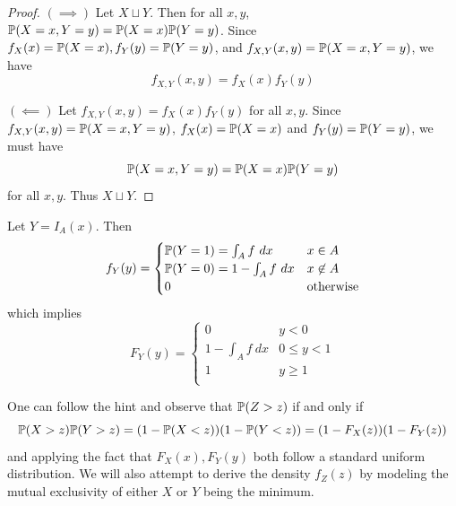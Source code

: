 \documentclass[a4paper]{article}
\begin{document}
\begin{proof}[Proof] 
\((\implies)\) Let \(X \sqcup Y\). Then for all \(x, y\), \(\mathbb{P}(X = x, Y=y) = \mathbb{P}(X = x)\mathbb{P}(Y = y)\). Since \(f_X(x) = \mathbb{P}(X = x), f_Y(y) = \mathbb{P}(Y = y)\), and \(f_{X,Y}(x,y) = \mathbb{P}(X = x, Y = y)\), we have
\[
	f_{X,Y}(x,y) = f_{X}(x)f_{Y}(y)
\]
\par \( (\impliedby) \) Let \(f_{X,Y}(x,y) = f_{X}(x)f_{Y}(y)\) for all \(x, y\). Since \(f_{X,Y}(x,y) = \mathbb{P}(X=x, Y=y)\), \(f_{X}(x) = \mathbb{P}(X=x)\) and \(f_{Y}(y) = \mathbb{P}(Y=y)\), we must have
\[
	\mathbb{P}(X=x, Y=y) = \mathbb{P}(X=x)\mathbb{P}(Y=y)
\]
for all \(x,y\). Thus \(X \sqcup Y\).
\end{proof}

Let \(Y = I_{A}(x)\). Then
\[
	f_{Y}(y) = \begin{cases}
		\mathbb{P}(Y = 1) = \int_{A} f \ dx & x \in A \\
		\mathbb{P}(Y = 0) = 1 - \int_{A} f \ dx & x \not\in A \\
		0 & \text{otherwise}
	\end{cases}
\]
which implies
\[
	F_{Y}(y) = \begin{cases}
		0 & y < 0 \\
		1 - \int_{A} f \ dx  & 0 \le y < 1 \\
		1 & y \ge 1 \\
	\end{cases}
\]

One can follow the hint and observe that \(\mathbb{P}(Z > z)\) if and only if 
\[
	\mathbb{P}(X > z)\mathbb{P}(Y > z) = (1 - \mathbb{P}(X < z))(1 - \mathbb{P}(Y < z)) = (1 - F_{X}(z))(1 - F_{Y}(z))
\]
and applying the fact that \(F_{X}(x), F_{Y}(y)\) both follow a standard uniform distribution. We will also attempt to derive the density \(f_{Z}(z)\) by modeling the mutual exclusivity of either \(X\) or \(Y\) being the minimum.
\end{document}
